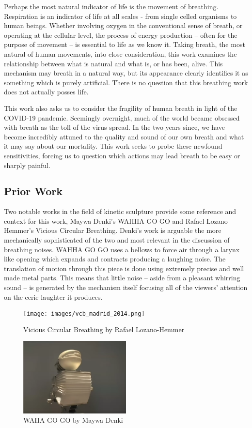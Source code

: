 \documentclass[letterpaper]{article}
\begin{document}
Perhaps the most natural indicator of life is the movement of breathing. Respiration is an indicator of life at all scales - from single celled organisms to human beings. Whether involving oxygen in the conventional sense of breath, or operating at the cellular level, the process of energy production -- often for the purpose of movement -- is essential to life as we know it. Taking breath, the most natural of human movements, into close consideration, this work examines the relationship between what is natural and what is, or has been, alive. This mechanism may breath in a natural way, but its appearance clearly identifies it as something which is purely artificial. There is no question that this breathing work does not actually posses life.   

This work also asks us to consider the fragility of human breath in light of the COVID-19 pandemic. Seemingly overnight, much of the world became obsessed with breath as the toll of the virus spread. In the two years since, we have become incredibly attuned to the quality and sound of our own breath and what it may say about our mortality. This work seeks to probe these newfound sensitivities, forcing us to question which actions may lead breath to be easy or sharply painful. 

\subsection{Prior Work}
Two notable works in the field of kinetic sculpture provide some reference and context for this work, Maywa Denki's WAHHA GO GO and Rafael Lozano-Hemmer's Vicious Circular Breathing. \cite{denki} \cite{lozanohemmer} Denki's work is arguable the more mechanically sophisticated of the two and most relevant in the discussion of breathing noises. WAHHA GO GO uses a bellows to force air through a larynx like opening which expands and contracts producing a laughing noise. The translation of motion through this piece is done using extremely precise and well made metal parts. This means that little noise -- aside from a pleasant whirring sound -- is generated by the mechanism itself focusing all of the viewers' attention on the eerie laughter it produces.

\begin{figure}[h]
\texttt{[image: images/vcb\_madrid\_2014.png]}
\caption{Vicious Circular Breathing by Rafael Lozano-Hemmer}
\end{figure}
\begin{figure}[h]
\includegraphics[width=0.5\textwidth]{images/whagogo.png}
\caption{WAHA GO GO by Maywa Denki}
\end{figure}
\end{document}

